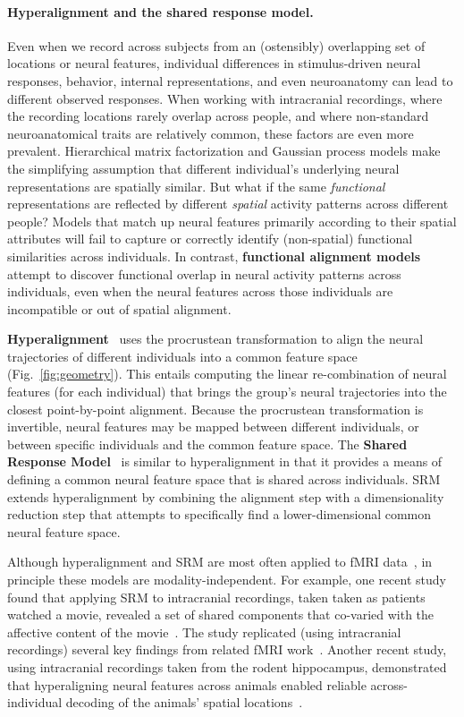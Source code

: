 \documentclass{llmxive}
\begin{document}
\paragraph{Hyperalignment and the shared response model.}
Even when we record across subjects from an (ostensibly) overlapping
set of locations or neural features, individual differences in
stimulus-driven neural responses, behavior, internal representations,
and even neuroanatomy can lead to different observed responses.  When
working with intracranial recordings, where the recording locations
rarely overlap across people, and where non-standard neuroanatomical
traits are relatively common, these factors are even more prevalent.
Hierarchical matrix factorization and Gaussian process models make the
simplifying assumption that different individual's underlying neural
representations are spatially similar.  But what if the same
\textit{functional} representations are reflected by different
\textit{spatial} activity patterns across different people?  Models
that match up neural features primarily according to their spatial attributes
will fail to capture or correctly identify (non-spatial) functional
similarities across individuals.  In contrast, \textbf{functional
  alignment models} attempt to discover functional overlap in neural
activity patterns across individuals, even when the neural features
across those individuals are incompatible or out of spatial alignment.

\textbf{Hyperalignment}~\citep{HaxbEtal11} uses the procrustean
transformation to align the neural trajectories of different
individuals into a common feature space (Fig.~\ref{fig:geometry}).
This entails computing the linear re-combination of neural features
(for each individual) that brings the group's neural trajectories into
the closest point-by-point alignment.  Because the procrustean
transformation is invertible, neural features may be mapped between
different individuals, or between specific individuals and the common
feature space.  The \textbf{Shared Response
  Model}~\citep[SRM;][]{ChenEtal15a} is similar to hyperalignment in
that it provides a means of defining a common neural feature space
that is shared across individuals.  SRM extends hyperalignment by
combining the alignment step with a dimensionality reduction step that
attempts to specifically find a lower-dimensional common neural
feature space.

Although hyperalignment and SRM are most often applied to fMRI
data~\citep{HaxbEtal20}, in principle these models are
modality-independent.  For example, one recent study found that
applying SRM to intracranial recordings, taken taken as patients
watched a movie, revealed a set of shared components that co-varied
with the affective content of the movie~\citep{XieEtal21}.  The study
replicated (using intracranial recordings) several key findings from
related fMRI work~\citep{ChanEtal21a}.  Another recent study, using
intracranial recordings taken from the rodent hippocampus,
demonstrated that hyperaligning neural features across animals enabled
reliable across-individual decoding of the animals' spatial
locations~\citep{ChenEtal21}.
\end{document}
